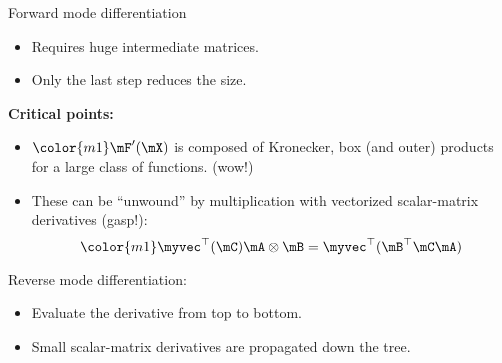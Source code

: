 \begin{frame}
Forward mode differentiation
\begin{itemize}
\item Requires huge intermediate matrices.
\item Only the last step reduces the size.
\end{itemize}
\textbf{Critical points:} 
\begin{itemize}
\item $\color{m1}\mF'(\mX)$ is composed of Kronecker, box (and outer)
  products for a large class of functions.  \alert{(wow!)}
\item These can be ``unwound'' by multiplication with vectorized
  scalar-matrix derivatives \alert{(gasp!)}:
$$\color{m1}
\myvec^\top(\mC)\mA\otimes\mB = \myvec^\top(\mB^\top\mC\mA)
$$
\end{itemize}
Reverse mode differentiation:
\begin{itemize}
\item Evaluate the derivative from top to bottom.
\item Small scalar-matrix derivatives are propagated down the tree.
\end{itemize}
\end{frame}



